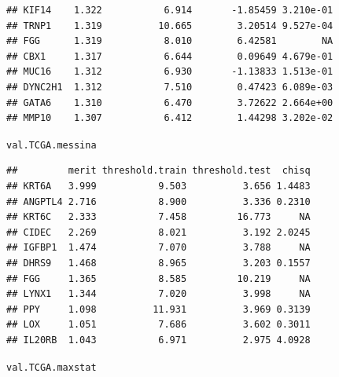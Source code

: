\documentclass{article}\usepackage[]{graphicx}\usepackage[]{color}
\makeatletter
\newcommand{\hlstd}[1]{\textcolor[rgb]{0.345,0.345,0.345}{#1}}%
\newenvironment{kframe}{%
 \def\at@end@of@kframe{}%
 \ifinner\ifhmode%
  \def\at@end@of@kframe{\end{minipage}}%
  \begin{minipage}{\columnwidth}%
 \fi\fi%
 \def\FrameCommand##1{\hskip\@totalleftmargin \hskip-\fboxsep
 \colorbox{shadecolor}{##1}\hskip-\fboxsep
     \hskip-\linewidth \hskip-\@totalleftmargin \hskip\columnwidth}%
 \MakeFramed {\advance\hsize-\width
   \@totalleftmargin\z@ \linewidth\hsize
   \@setminipage}}%
 {\par\unskip\endMakeFramed%
 \at@end@of@kframe}
\newenvironment{knitrout}{}{} %
\makeatother
\begin{document}
\begin{knitrout}
\begin{kframe}
\begin{verbatim}
## KIF14    1.322           6.914       -1.85459 3.210e-01
## TRNP1    1.319          10.665        3.20514 9.527e-04
## FGG      1.319           8.010        6.42581        NA
## CBX1     1.317           6.644        0.09649 4.679e-01
## MUC16    1.312           6.930       -1.13833 1.513e-01
## DYNC2H1  1.312           7.510        0.47423 6.089e-03
## GATA6    1.310           6.470        3.72622 2.664e+00
## MMP10    1.307           6.412        1.44298 3.202e-02
\end{verbatim}
\begin{alltt}
\hlstd{val.TCGA.messina}
\end{alltt}
\begin{verbatim}
##         merit threshold.train threshold.test  chisq
## KRT6A   3.999           9.503          3.656 1.4483
## ANGPTL4 2.716           8.900          3.336 0.2310
## KRT6C   2.333           7.458         16.773     NA
## CIDEC   2.269           8.021          3.192 2.0245
## IGFBP1  1.474           7.070          3.788     NA
## DHRS9   1.468           8.965          3.203 0.1557
## FGG     1.365           8.585         10.219     NA
## LYNX1   1.344           7.020          3.998     NA
## PPY     1.098          11.931          3.969 0.3139
## LOX     1.051           7.686          3.602 0.3011
## IL20RB  1.043           6.971          2.975 4.0928
\end{verbatim}
\begin{alltt}
\hlstd{val.TCGA.maxstat}
\end{alltt}


{\ttfamily\noindent\bfseries\color{errorcolor}{\#\# Error in eval(expr, envir, enclos): object 'val.TCGA.maxstat' not found}}\end{kframe}
\end{knitrout}
\end{document}
